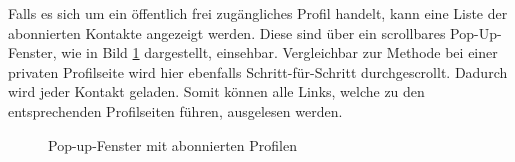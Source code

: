 	Falls es sich um ein öffentlich frei zugängliches Profil handelt, kann eine Liste der abonnierten Kontakte angezeigt werden. Diese sind über ein scrollbares Pop-Up-Fenster, wie in Bild \ref{img:instagram_abonniert} dargestellt, einsehbar. Vergleichbar zur Methode bei einer privaten Profilseite wird hier ebenfalls Schritt-für-Schritt durchgescrollt. Dadurch wird jeder Kontakt geladen. Somit können alle Links, welche zu den entsprechenden Profilseiten führen, ausgelesen werden. 
	
	
	
	\begin{figure}[h!]
		\centering
		\caption{Pop-up-Fenster mit abonnierten Profilen \cite{instagram}}
		\label{img:instagram_abonniert}
	\end{figure}
	

